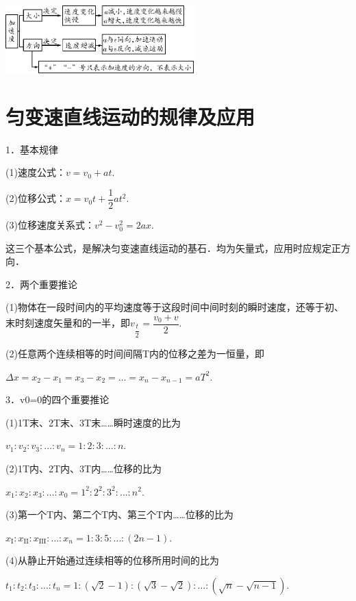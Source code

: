 \documentclass[cn,10.5pt,chinese,mac,chinesefont=founder]{elegantbook}
\begin{document}
\begin{center}\includegraphics[width=2.86458in,height=1.03125in]{media/image16.png}\end{center}

\newpage
\section{匀变速直线运动的规律及应用}



1．基本规律

(1)速度公式：$v=v_{0}+a t$.

(2)位移公式：$x=v_{0} t+\dfrac{1}{2} a t^2$.

(3)位移速度关系式：$v^{2}-v_{0}^{2}=2 a x$.

这三个基本公式，是解决匀变速直线运动的基石．均为矢量式，应用时应规定正方向．

2．两个重要推论

(1)物体在一段时间内的平均速度等于这段时间中间时刻的瞬时速度，还等于初、末时刻速度矢量和的一半，即$v_{\dfrac{t}{2}}=\dfrac{v_{0}+v}{2}$.

(2)任意两个连续相等的时间间隔T内的位移之差为一恒量，即

$\Delta x=x_{2}-x_{1}=x_{3}-x_{2}=\ldots=x_{n}-x_{n-1}=a T^{2}$.

3．v0=0的四个重要推论

(1)1T末、2T末、3T末\ldots\ldots 瞬时速度的比为

$v_{1} : v_{2} : v_{3} : \ldots : v_{n}=1 : 2 : 3 : \ldots : n$.

(2)1T内、2T内、3T内\ldots\ldots 位移的比为

$x_{1} : x_{2} : x_{3} : \ldots : x_{0}=1^{2} : 2^{2} : 3^{2} : \ldots : n^{2}$.

(3)第一个T内、第二个T内、第三个T内\ldots\ldots 位移的比为

$x_{\mathrm{I}} : x_{\mathrm{II}} : x_{\mathrm{III}} : \ldots : x_{n}=1 : 3 : 5 : \ldots :(2 n-1)$.

(4)从静止开始通过连续相等的位移所用时间的比为

$t_{1} : t_{2} : t_{3} : \ldots : t_{n}=1 :(\sqrt{2}-1) :(\sqrt{3}-\sqrt{2}) : \ldots :(\sqrt{n}-\sqrt{n-1})$.
\end{document}
